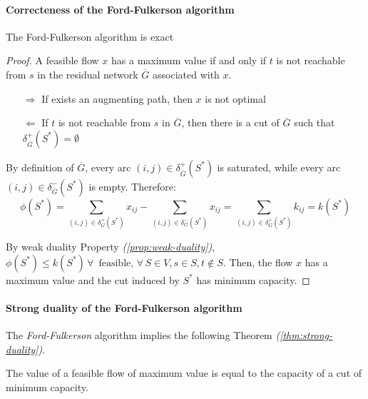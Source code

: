 \documentclass[english]{article}
\begin{document}
\paragraph{Correcteness of the Ford-Fulkerson algorithm}

\begin{proposition}
  The Ford-Fulkerson algorithm is exact
\end{proposition}

\begin{proof}
  A feasible flow \(x\) has a maximum value if and only if \(t\) is not reachable from \(s\) in the residual network \(\overline{G}\) associated with \(x\).

  \begin{itemize}
    \item[\(\Rightarrow\)] If exists an augmenting path, then \(x\) is not optimal
    \item[\(\Leftarrow\)] If \(t\) is not reachable from \(s\) in \(\overline{G}\), then there is a cut of \(\overline{G}\) such that \(\delta^+_{\overline{G}}(S^\ast) = \emptyset\)
  \end{itemize}

  By definition of \(\overline{G}\), every arc \(\left( i, j \right) \in \delta^+_{\overline{G}}(S^\ast)\) is saturated, while every arc \(\left( i, j \right) \in \delta^-_{\overline{G}}(S^\ast)\) is empty.
  Therefore:
  \[ \phi(S^\ast) = \displaystyle \sum_{\left( i, j \right) \in \delta^+_G(S^\ast) } x_{ij} - \displaystyle \sum_{\left( i, j \right) \in \delta^-_G(S^\ast) } x_{ij} = \displaystyle \sum_{\left( i, j \right) \in \delta^+_G(S^\ast) } k_{ij} = k(S^\ast) \]

  By weak duality Property \textit{(\ref{prop:weak-duality})}, \(\phi(S^\ast) \leq k(S^\ast) \, \forall \, \text{ feasible}, \, \forall \, S \in V, s\in S, t \notin S\).
  Then, the flow \(x\) has a maximum value and the cut induced by \(S^\ast\) has minimum capacity.
\end{proof}

\paragraph{Strong duality of the Ford-Fulkerson algorithm}

The \textit{Ford-Fulkerson} algorithm implies the following Theorem \textit{(\ref{thm:strong-duality})}.

\begin{theorem}
  The value of a feasible flow of maximum value is equal to the capacity of a cut of minimum capacity.
  \label{thm:strong-duality}
\end{theorem}
\end{document}
